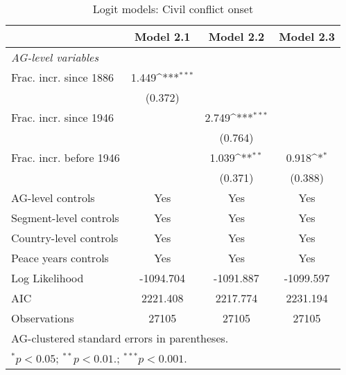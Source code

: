 \begin{table}[htbp]\centering
\def\sym#1{\ifmmode^{#1}\else\(^{#1}\)\fi}
\caption{Logit models: Civil conflict onset \label{tab:SEGlogit2}}
\begin{tabular}{l*{3}{c}}
\hline\hline
                    &\multicolumn{1}{c}{Model 2.1}&\multicolumn{1}{c}{Model 2.2}&\multicolumn{1}{c}{Model 2.3}\\
\hline
\textit{AG-level variables}&                     &                     &                     \\
Frac. incr. since 1886&       1.449\sym{***}&                     &                     \\
                    &     (0.372)         &                     &                     \\
Frac. incr. since 1946&                     &       2.749\sym{***}&                     \\
                    &                     &     (0.764)         &                     \\
Frac. incr. before 1946&                     &       1.039\sym{**} &       0.918\sym{*}  \\
                    &                     &     (0.371)         &     (0.388)         \\
\hline
AG-level controls   &         Yes         &         Yes         &         Yes         \\
Segment-level controls&         Yes         &         Yes         &         Yes         \\
Country-level controls&         Yes         &         Yes         &         Yes         \\
Peace years controls&         Yes         &         Yes         &         Yes         \\
Log Likelihood      &   -1094.704         &   -1091.887         &   -1099.597         \\
AIC                 &    2221.408         &    2217.774         &    2231.194         \\
Observations        &       27105         &       27105         &       27105         \\
\hline\hline
\multicolumn{4}{l}{\footnotesize AG-clustered standard errors in parentheses.}\\
\multicolumn{4}{l}{\footnotesize $^{*}p<0.05$; $^{**}p<0.01.$; $^{***}p<0.001.$ }\\
\end{tabular}
\end{table}
